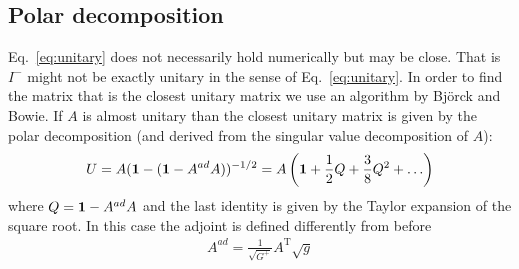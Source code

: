 \subsection{Polar decomposition}
Eq.~\eqref{eq:unitary} does not necessarily hold numerically but may be close.
That is $I^{-}$ might not be exactly unitary in the sense of Eq.~\eqref{eq:unitary}.
In order to find the matrix that is the closest unitary matrix we use an algorithm
by Bj\"orck and Bowie. If $A$ is almost unitary than the closest unitary matrix
is given by the polar decomposition (and derived from the singular value decomposition of $A$):
\begin{align}
    U = A( \mathbf{1} - (\mathbf{1} - A^{ad} A))^{-1/2} = A \left( \mathbf{1} + \frac{1}{2}Q
   +\frac{3}{8}Q^2 + \ldots\right)
\end{align}
where  $Q=\mathbf{1}-A^{ad} A$ and the last identity is given by the Taylor expansion of the square root.
In this case the adjoint is defined differently from before
\begin{align}
    A^{ad}  = \frac{1}{\sqrt{G^+}}A^\mathrm{T}\sqrt{g}
\end{align}


%
%


